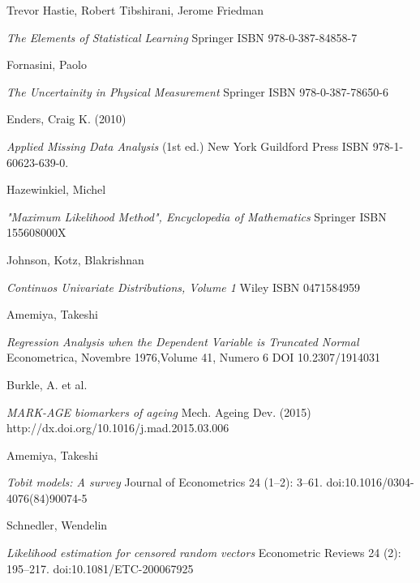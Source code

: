 \documentclass[12pt,openright,twoside,a4paper]{book}
\begin{document}
\backmatter
\begin{thebibliography}{99}
Trevor Hastie, Robert Tibshirani, Jerome Friedman

\emph{The Elements of Statistical Learning}
Springer ISBN 978-0-387-84858-7

Fornasini, Paolo

\emph{The Uncertainity in Physical Measurement}
Springer ISBN 978-0-387-78650-6

Enders, Craig K. (2010)

\emph{Applied Missing Data Analysis } (1st ed.)
 New York
 Guildford Press ISBN 978-1-60623-639-0.

Hazewinkiel, Michel

\emph{"Maximum Likelihood Method", Encyclopedia of Mathematics}
Springer ISBN 155608000X

Johnson, Kotz, Blakrishnan

\emph{Continuos Univariate Distributions, Volume 1}
Wiley ISBN 0471584959 

Amemiya, Takeshi 

\emph{Regression Analysis when the Dependent Variable is Truncated Normal}
Econometrica, Novembre 1976,Volume 41, Numero 6  DOI 10.2307/1914031

Burkle, A. et al.

\emph{MARK-AGE biomarkers of ageing} 
Mech. Ageing Dev. (2015) http://dx.doi.org/10.1016/j.mad.2015.03.006

Amemiya, Takeshi 

\emph{Tobit models: A survey}
 Journal of Econometrics 24 (1–2): 3–61. doi:10.1016/0304-4076(84)90074-5

Schnedler, Wendelin

\emph{Likelihood estimation for censored random vectors}
Econometric Reviews 24 (2): 195–217. doi:10.1081/ETC-200067925

\end{thebibliography}
\end{document}
